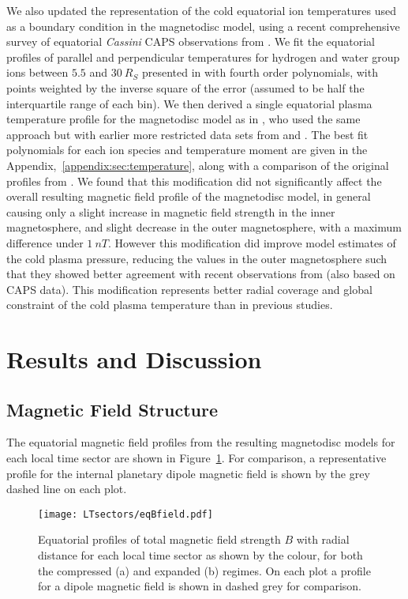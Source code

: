 We also updated the representation of the cold equatorial ion temperatures used as a boundary condition in the magnetodisc model, using a recent comprehensive survey of equatorial \textit{Cassini} CAPS observations from \citet{wilson2017}. We fit the equatorial profiles of parallel and perpendicular temperatures for hydrogen and water group ions between $5.5$ and $\SI{30}{R_S}$ presented in \citet{wilson2017} with fourth order polynomials, with points weighted by the inverse square of the error (assumed to be half the interquartile range of each bin). We then derived a single equatorial plasma temperature profile for the magnetodisc model as in \citet{achilleos2010b}, who used the same approach but with earlier more restricted data sets from \citet{wilson2008} and \citet{mcandrews2009}. The best fit polynomials for each ion species and temperature moment are given in the Appendix,~\ref{appendix:sec:temperature}, along with a comparison of  the original profiles from \citet{achilleos2010b}. We found that this modification did not significantly affect the overall resulting magnetic field profile of the magnetodisc model, in general causing only a slight increase in magnetic field strength in the inner magnetosphere, and slight decrease in the outer magnetosphere, with a maximum difference under $\SI{1}{nT}$. However this modification did improve model estimates of the cold plasma pressure, reducing the values in the outer magnetosphere such that they showed better agreement with recent observations from \citet{sergis2017} (also based on CAPS data). This modification represents better radial coverage and global constraint of the cold plasma temperature than in previous studies.

\section{Results and Discussion}\label{LTsectors:sec:results}
\subsection{Magnetic Field Structure}
The equatorial magnetic field profiles from the resulting magnetodisc models for each local time sector are shown in Figure~\ref{LTsectors:fig:eqBfield}. For comparison, a representative profile for the internal planetary dipole magnetic field is shown by the grey dashed line on each plot.

\begin{figure}
\centering
\texttt{[image: LTsectors/eqBfield.pdf]}
\caption[Model equatorial profiles of magnetic field strength $B$ for different local time sectors, for compressed and expanded regimes.]{Equatorial profiles of total magnetic field strength $B$ with radial distance for each local time sector as shown by the colour, for both the compressed (a) and expanded (b) regimes. On each plot a profile for a dipole magnetic field is shown in dashed grey for comparison.}
\label{LTsectors:fig:eqBfield}
\end{figure}

